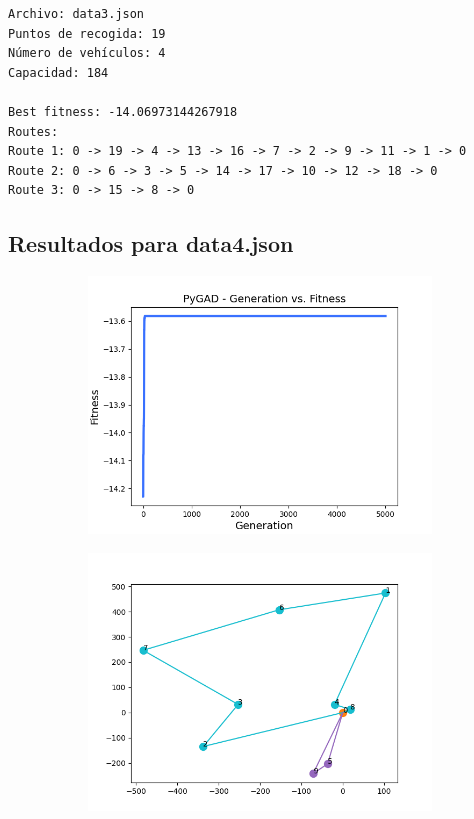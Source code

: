 \documentclass[12pt]{llncs}
\begin{document}
\begin{verbatim}
Archivo: data3.json
Puntos de recogida: 19
Número de vehículos: 4
Capacidad: 184

Best fitness: -14.06973144267918
Routes:
Route 1: 0 -> 19 -> 4 -> 13 -> 16 -> 7 -> 2 -> 9 -> 11 -> 1 -> 0
Route 2: 0 -> 6 -> 3 -> 5 -> 14 -> 17 -> 10 -> 12 -> 18 -> 0
Route 3: 0 -> 15 -> 8 -> 0
\end{verbatim}

\subsection*{Resultados para data4.json}

\begin{figure}[!ht]
    \centering
    \begin{subfigure}[b]{0.496\linewidth}
      \includegraphics[width=\linewidth]{../../images/data4-training.png}
    \end{subfigure}
    \begin{subfigure}[b]{0.496\linewidth}
      \includegraphics[width=\linewidth]{../../images/data4-graph.png}
    \end{subfigure}
    \label{fig:data4}
\end{figure}
\end{document}
